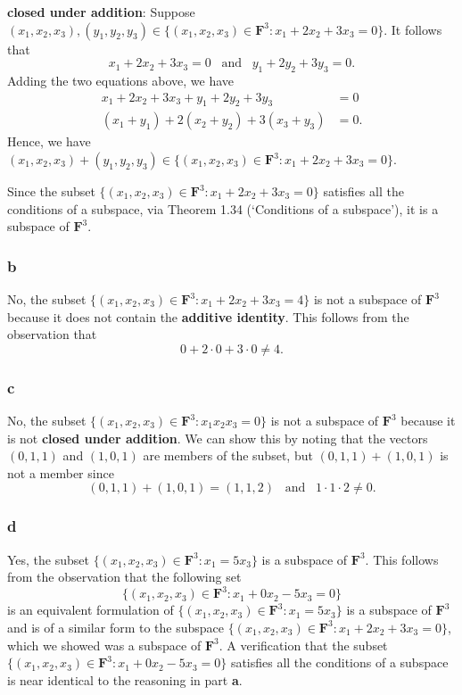 \documentclass{article}
\begin{document}
\textbf{closed under addition}: Suppose\newline $(x_1,x_2,x_3),(y_1,y_2,y_3)\in\{(x_1,x_2,x_3)\in\mathbf{F}^3:x_1+2x_2+3x_3=0\}$. 
It follows that 
\[x_1+2x_2+3x_3=0\;\;\;\text{and}\;\;\;y_1+2y_2+3y_3=0.\]
Adding the two equations above, we have
\begin{align*}
    x_1+2x_2+3x_3+y_1+2y_2+3y_3&=0\\
    (x_1+y_1)+2(x_2+y_2)+3(x_3+y_3)&=0.
\end{align*}
Hence, we have\newline $(x_1,x_2,x_3)+(y_1,y_2,y_3)\in\{(x_1,x_2,x_3)\in\mathbf{F}^3:x_1+2x_2+3x_3=0\}$.

Since the subset $\{(x_1,x_2,x_3)\in\mathbf{F}^3:x_1+2x_2+3x_3=0\}$ satisfies all the conditions of a subspace, via Theorem 1.34 (`Conditions of a subspace'), it is a subspace of $\mathbf{F}^3$.

\subsubsection*{b}
No, the subset $\{(x_1,x_2,x_3)\in\mathbf{F}^3:x_1+2x_2+3x_3=4\}$  is not a subspace of $\textbf{F}^3$ because it does not contain the \textbf{additive identity}. 
This follows from the observation that
\[0+2\cdot 0 + 3\cdot 0\neq 4.\]

\subsubsection*{c}
No, the subset $\{(x_1,x_2,x_3)\in\mathbf{F}^3:x_1x_2x_3=0\}$ is not a subspace of $\textbf{F}^3$ because it is not \textbf{closed under addition}. 
We can show this by noting that the vectors $(0,1,1)$ and $(1,0,1)$ are members of the subset, but $(0,1,1)+(1,0,1)$ is not a member since
\[(0,1,1)+(1,0,1)=(1,1,2)\;\;\;\text{and}\;\;\;1\cdot1\cdot2\neq0.\]

\subsubsection*{d}
Yes, the subset $\{(x_1,x_2,x_3)\in\mathbf{F}^3:x_1=5x_3\}$ is a subspace of $\textbf{F}^3$. 
This follows from the observation that the following set 
\[\{(x_1,x_2,x_3)\in\mathbf{F}^3:x_1+0x_2-5x_3=0\}\]
is an equivalent formulation of $\{(x_1,x_2,x_3)\in\mathbf{F}^3:x_1=5x_3\}$ is a subspace of $\textbf{F}^3$ and is of a similar form to the subspace $\{(x_1,x_2,x_3)\in\mathbf{F}^3:x_1+2x_2+3x_3=0\}$, which we showed was a subspace of $\textbf{F}^3$. 
A verification that the subset $\{(x_1,x_2,x_3)\in\mathbf{F}^3:x_1+0x_2-5x_3=0\}$ satisfies all the conditions of a subspace is near identical to the reasoning in part \textbf{a}.
\end{document}
